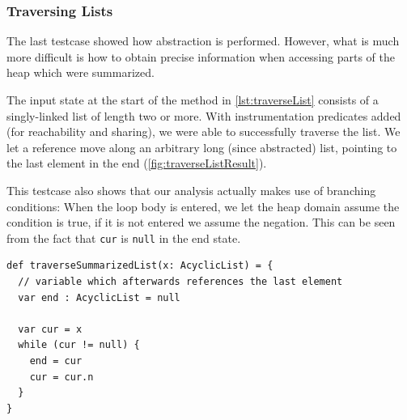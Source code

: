 \documentclass[11pt,a4paper,english]{article}
\begin{document}
\subsubsection{Traversing Lists}
The last testcase showed how abstraction is performed. However, what is much
more difficult is how to obtain precise information when accessing parts
of the heap which were summarized. 

The input state at the start of the method in \autoref{lst:traverseList} consists
of a singly-linked list of length two or more. With instrumentation predicates
added (for reachability and sharing), we were able to successfully traverse the
list. We let a reference move along an arbitrary long (since abstracted) list,
pointing to the last element in the end (\autoref{fig:traverseListResult}).

This testcase also shows that our analysis actually makes use of branching
conditions: When the loop body is entered, we let the heap domain assume the
condition is true, if it is not entered we assume the negation. This can be seen
from the fact that \texttt{cur} is \texttt{null} in the end state. 

\begin{lstlisting}[float,caption={List traversal testcase},label={lst:traverseList}]
def traverseSummarizedList(x: AcyclicList) = {
  // variable which afterwards references the last element
  var end : AcyclicList = null

  var cur = x
  while (cur != null) {
    end = cur
    cur = cur.n
  } 	  
}
\end{lstlisting}
\end{document}

